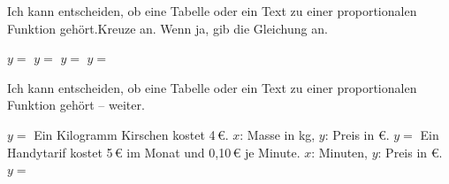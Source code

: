 
\begin{aufgabe}{Ich kann entscheiden, ob eine Tabelle oder ein Text zu einer proportionalen Funktion gehört.\newline Kreuze an. Wenn ja, gib die Gleichung an.}
\begin{teile}
\teil {} \quad \janein \quad $y = $ \leerfeld
\teil {} \quad \janein \quad $y = $ \leerfeld
\teil {} \quad \janein \quad $y = $ \leerfeld
\teil {} \quad \janein \quad $y = $ \leerfeld
\end{teile}
\end{aufgabe}

\begin{aufgabe}{Ich kann entscheiden, ob eine Tabelle oder ein Text zu einer proportionalen Funktion gehört – weiter.}
\begin{teile}
\teil {} \quad \janein \quad $y = $ \leerfeld
\teil Ein Kilogramm Kirschen kostet 4\,€. $x$: Masse in kg, $y$: Preis in €. \newline \janein \quad $y = $ \leerfeld
\teil Ein Handytarif kostet 5\,€ im Monat und 0,10\,€ je Minute. $x$: Minuten, $y$: Preis in €. \newline \janein \quad $y = $ \leerfeld
\end{teile}
\end{aufgabe}


